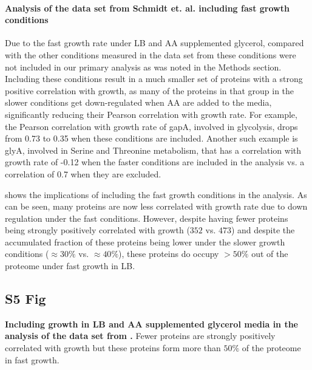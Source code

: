 \documentclass[10pt,letterpaper]{article}
\newcommand{\hGlobal}{$473$}
\newcommand{\hGlobalLB}{$352$}
\begin{document}
\paragraph{Analysis of the data set from Schmidt et. al. including fast growth conditions}
Due to the fast growth rate under LB and AA supplemented glycerol, compared with the other conditions measured in the data set from \cite{Schmidt2015} these conditions were not included in our primary analysis as was noted in the Methods section.
Including these conditions result in a much smaller set of proteins with a strong positive correlation with growth, as many of the proteins in that group in the slower conditions get down-regulated when AA are added to the media, significantly reducing their Pearson correlation with growth rate.
For example, the Pearson correlation with growth rate of gapA, involved in glycolysis, drops from 0.73 to 0.35 when these conditions are included.
Another such example is glyA, involved in Serine and Threonine metabolism, that has a correlation with
growth rate of -0.12 when the faster conditions are included in the analysis vs. a correlation of 0.7 when they are excluded.

 shows the implications of including the fast growth conditions in the analysis.
As can be seen, many proteins are now less correlated with growth rate due to down regulation under the fast conditions.
However, despite having fewer proteins being strongly positively correlated with growth (\hGlobalLB{} vs. \hGlobal{}) and despite the accumulated fraction of these proteins being lower under the slower growth conditions ($\approx30\%$ vs. $\approx40\%$), these proteins do occupy $>50\%$ out of the proteome under fast growth in LB.

\subsection*{S5 Fig}
\label{fig:LB}
    {\bf Including growth in LB and AA supplemented glycerol media in the analysis of the data set from \cite{Schmidt2015}.}
Fewer proteins are strongly positively correlated with growth but these proteins form more than $50\%$ of the proteome in fast growth.%
\end{document}
